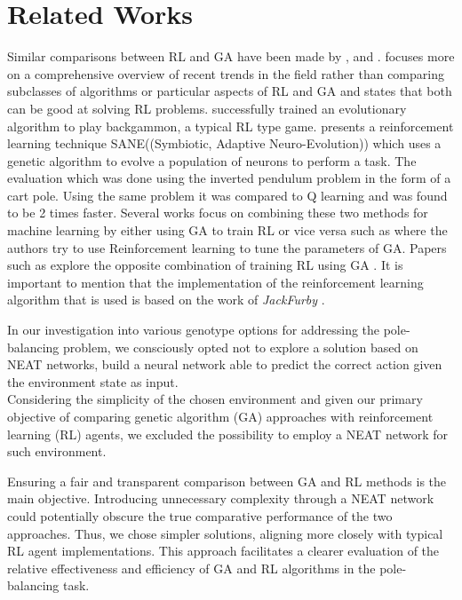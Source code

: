 \section{Related Works}

Similar comparisons between RL and GA have been made by \cite{drugan2019reinforcement},\cite{taylor2006comparing} and \cite{pollack1997coevolution}. \cite{drugan2019reinforcement}  focuses more on a comprehensive overview of recent trends in the field rather than comparing subclasses of algorithms or particular aspects of RL and GA and states that both can be good at solving RL problems. \cite{pollack1997coevolution} successfully trained an evolutionary algorithm to play backgammon, a typical RL type game. \cite{moriarty1996efficient} presents a reinforcement learning technique SANE((Symbiotic, Adaptive Neuro-Evolution)) which uses a genetic algorithm to evolve a population of neurons to perform a task. The evaluation which was done using the inverted pendulum problem in the form of a cart pole. Using the same problem it was compared to Q learning and was found to be 2 times faster. Several works focus on combining these two methods for machine learning by either using GA to train RL or vice versa such as \cite{eiben2007reinforcement} where the authors try to use Reinforcement learning to tune the parameters of GA.  Papers such as  \cite{khadka2018evolutionary} explore the opposite combination of training RL using GA . It is important to mention that the implementation of the reinforcement learning algorithm that is used is based on the work of \textit{JackFurby} \cite{JackFurbyCartPole}. 

In our investigation into various genotype options for addressing the pole-balancing problem, we consciously opted not to explore a solution based on NEAT\cite{stanley2002NEAT} networks, build a neural network able to predict the correct action given the environment state as input.\\
Considering the simplicity of the chosen environment and given our primary objective of comparing genetic algorithm (GA) approaches with reinforcement learning (RL) agents, we excluded the possibility to employ a NEAT network for such environment.

Ensuring a fair and transparent comparison between GA and RL methods is the main objective. Introducing unnecessary complexity through a NEAT network could potentially obscure the true comparative performance of the two approaches. Thus, we chose simpler solutions, aligning more closely with typical RL agent implementations. This approach facilitates a clearer evaluation of the relative effectiveness and efficiency of GA and RL algorithms in the pole-balancing task.